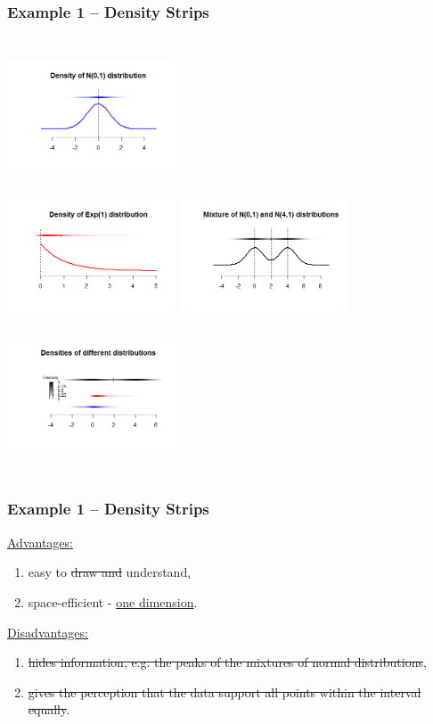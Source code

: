 \documentclass[11pt,usenames,dvipsnames,svgnames,x11names]{beamer}
\theoremstyle{plain}
\theoremstyle{definition}
\theoremstyle{remark}
\begin{document}
\begin{frame}
	\frametitle{Example 1 -- Density Strips}
	\begin{columns}[t]
			\centering
			\includegraphics[width=5cm,height=4cm]{1111111.png}\\
			\includegraphics[width=5cm,height=4cm]{2222222.png}
		\centering
		\includegraphics[width=5cm,height=4cm]{3333333.png}\\
		\includegraphics[width=5cm,height=4cm]{4444444.png}
	\end{columns}
\end{frame}

\begin{frame}
	\frametitle{Example 1 -- Density Strips}
	\underline{Advantages:}	
	\begin{enumerate}
		\item easy to \sout{draw and} understand,
		\item space-efficient - \underline{one dimension}.
	\end{enumerate}
	\bigskip
	\underline{Disadvantages:}
	\begin{enumerate}
		\item \sout{hides information, e.g. the peaks of the mixtures of normal distributions},
		\item \sout{gives the perception that the data support all points within the interval equally}.
	\end{enumerate}
\end{frame}
\end{document}
